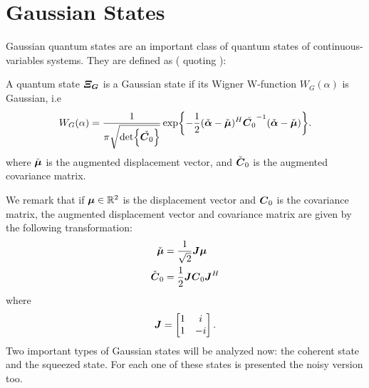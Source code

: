 \section{Gaussian States}
    \label{def:Gaussian}
    Gaussian quantum states are an important class of quantum states of continuous-variables systems.
    They are defined as (\cite{tesiGuerrini} quoting \cite{Gaussian1,Gaussian2,Gaussian3,Gaussian4,Gaussian5}):
    \begin{definition}
        A quantum state $\Operator{\varXi_G}$ is a Gaussian state if its Wigner W-function $W_G(\alpha)$
        is Gaussian, i.e
        \begin{equation}
            W_G(\alpha)=\frac{1}{\pi\sqrt{\det{\check{\Operator{C}_0}}}}\exp{
                -\frac{1}{2}(\check{\Vector{\alpha}}-\check{\Vector{\mu}})^H
                \check{\Operator{C}_0}^{-1}(\check{\Vector{\alpha}}-\check{\Vector{\mu}})}.
        \end{equation}
        where $\check{\Vector{\mu}} $ is the augmented displacement vector, and $\check{\Operator{C}}_0$ 
        is the augmented covariance matrix. 
    \end{definition}
    
    We remark that if $\Vector{\mu} \in \mathbb{R}^2$ is the 
    displacement vector and $\Operator{C}_0$ is the covariance matrix, the augmented displacement vector
    and covariance matrix are given by the following transformation:
    \begin{subequations}
        \begin{align}
            \check{\Vector{\mu}} &= \frac{1}{\sqrt{2}} \Operator{J} \Vector{\mu}\\
            \check{\Operator{C}}_0 &= \frac{1}{2} \Operator{J} \Operator{C}_0 \Operator{J}^H
        \end{align}
    \end{subequations}
    where
    \begin{equation*}
        \Operator{J} = 
        \begin{bmatrix}
            1 & i\\
            1 & -i
        \end{bmatrix}.
    \end{equation*}
    Two important types of Gaussian states will be analyzed now: the coherent state and the
    squeezed state. For each one of these states is presented the noisy version too.

